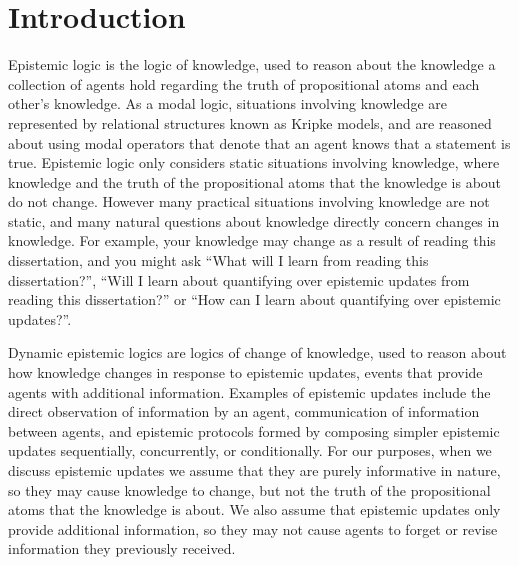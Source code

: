 \chapter{Introduction}\label{introduction}

Epistemic logic is the logic of knowledge, used to reason about the knowledge a collection of agents hold regarding the truth of propositional atoms and each other's knowledge.
As a modal logic, situations involving knowledge are represented by relational structures known as Kripke models, and are reasoned about using modal operators that denote that an agent knows that a statement is true.
Epistemic logic only considers static situations involving knowledge, where knowledge and the truth of the propositional atoms that the knowledge is about do not change.
However many practical situations involving knowledge are not static, and many natural questions about knowledge directly concern changes in knowledge.
For example, your knowledge may change as a result of reading this dissertation, and you might ask ``What will I learn from reading this dissertation?'', ``Will I learn about quantifying over epistemic updates from reading this dissertation?'' or ``How can I learn about quantifying over epistemic updates?''.

Dynamic epistemic logics are logics of change of knowledge, used to reason about how knowledge changes in response to epistemic updates, events that provide agents with additional information.
Examples of epistemic updates include the direct observation of information by an agent, communication of information between agents, and epistemic protocols formed by composing simpler epistemic updates sequentially, concurrently, or conditionally.
For our purposes, when we discuss epistemic updates we assume that they are purely informative in nature, so they may cause knowledge to change, but not the truth of the propositional atoms that the knowledge is about.
We also assume that epistemic updates only provide additional information, so they may not cause agents to forget or revise information they previously received.

